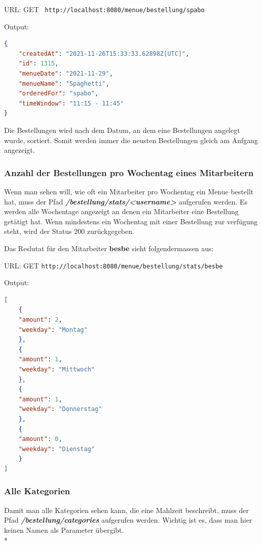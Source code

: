 URL: GET \colorbox{white}{\lstinline[basicstyle=\ttfamily\color{black},language=html]| http://localhost:8080/menue/bestellung/spabo|}


Output:

\begin{lstlisting}[language=json,firstnumber=1]
{
    "createdAt": "2021-11-26T15:33:33.62898Z[UTC]",
    "id": 1315,
    "menueDate": "2021-11-29",
    "menueName": "Spaghetti",
    "orderedFor": "spabo",
    "timeWindow": "11:15 - 11:45"
}
\end{lstlisting}

Die Bestellungen wird nach dem Datum, an dem eine Bestellungen angelegt wurde, sortiert. Somit werden immer die neusten Bestellungen gleich am Anfgang angezeigt.


\subsubsection{Anzahl der Bestellungen pro Wochentag eines Mitarbeitern}

Wenn man sehen will, wie oft ein Mitarbeiter pro Wochentag ein Menue bestellt hat, muss der Pfad \textbf{\textit{/bestellung/stats/<username>}} aufgerufen werden.
Es werden alle Wochentage angezeigt an denen ein Mitarbeiter eine Bestellung getätigt hat. Wenn mindestens ein Wochentag mit einer Bestellung zur verfügung steht, 
wird der Status 200 zurückgegeben.

Das Reslutat für den Mitarbeiter \textbf{besbe} sieht folgendermassen aus:


URL: GET \colorbox{white}{\lstinline[basicstyle=\ttfamily\color{black},language=html]|http://localhost:8080/menue/bestellung/stats/besbe|}


Output:

\begin{lstlisting}[language=json,firstnumber=1]
[
    {
    "amount": 2,
    "weekday": "Montag"
    },
    {
    "amount": 1,
    "weekday": "Mittwoch"
    },
    {
    "amount": 1,
    "weekday": "Donnerstag"
    },
    {
    "amount": 0,
    "weekday": "Dienstag"
    }
]
\end{lstlisting}

\pagebreak

\subsubsection{Alle Kategorien}

Damit man alle Kategorien sehen kann, die eine Mahlzeit beschreibt, muss der Pfad  \textbf{\textit{/bestellung/categories}} aufgerufen werden.
Wichtig ist es, dass man hier keinen Namen als Parameter übergibt. \\*

